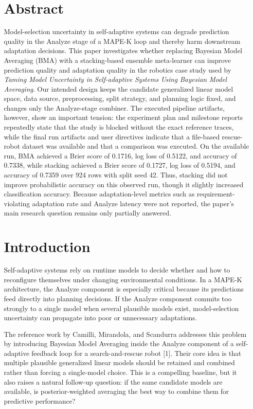 \documentclass[11pt,a4paper]{article}
\begin{document}
\section{Abstract}
Model-selection uncertainty in self-adaptive systems can degrade prediction quality in the Analyze stage of a MAPE-K loop and thereby harm downstream adaptation decisions. This paper investigates whether replacing Bayesian Model Averaging (BMA) with a stacking-based ensemble meta-learner can improve prediction quality and adaptation quality in the robotics case study used by \textit{Taming Model Uncertainty in Self-adaptive Systems Using Bayesian Model Averaging}. Our intended design keeps the candidate generalized linear model space, data source, preprocessing, split strategy, and planning logic fixed, and changes only the Analyze-stage combiner. The executed pipeline artifacts, however, show an important tension: the experiment plan and milestone reports repeatedly state that the study is blocked without the exact reference traces, while the final run artifacts and user directives indicate that a file-based rescue-robot dataset was available and that a comparison was executed. On the available run, BMA achieved a Brier score of 0.1716, log loss of 0.5122, and accuracy of 0.7338, while stacking achieved a Brier score of 0.1727, log loss of 0.5194, and accuracy of 0.7359 over 924 rows with split seed 42. Thus, stacking did not improve probabilistic accuracy on this observed run, though it slightly increased classification accuracy. Because adaptation-level metrics such as requirement-violating adaptation rate and Analyze latency were not reported, the paper’s main research question remains only partially answered.


\section{Introduction}
Self-adaptive systems rely on runtime models to decide whether and how to reconfigure themselves under changing environmental conditions. In a MAPE-K architecture, the Analyze component is especially critical because its predictions feed directly into planning decisions. If the Analyze component commits too strongly to a single model when several plausible models exist, model-selection uncertainty can propagate into poor or unnecessary adaptations.

The reference work by Camilli, Mirandola, and Scandurra addresses this problem by introducing Bayesian Model Averaging inside the Analyze component of a self-adaptive feedback loop for a search-and-rescue robot [1]. Their core idea is that multiple plausible generalized linear models should be retained and combined rather than forcing a single-model choice. This is a compelling baseline, but it also raises a natural follow-up question: if the same candidate models are available, is posterior-weighted averaging the best way to combine them for predictive performance?
\end{document}
